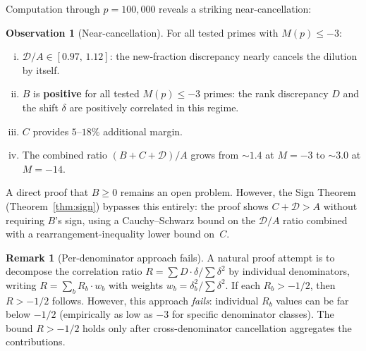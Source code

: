 \documentclass[11pt]{article}
\theoremstyle{definition}
\newtheorem{remark}[theorem]{Remark}
\newtheorem{observation}[theorem]{Observation}
\begin{document}
Computation through $p = 100{,}000$ reveals a striking near-cancellation:

\begin{observation}[Near-cancellation]\label{obs:near-cancel}
For all tested primes with $M(p) \le -3$:
\begin{enumerate}[(i)]
  \item $\mathcal{D}/A \in [0.97,\, 1.12]$: the new-fraction discrepancy nearly
    cancels the dilution by itself.
  \item $B$ is \textbf{positive} for all tested $M(p) \le -3$ primes:
    the rank discrepancy $D$ and
    the shift $\delta$ are positively correlated in this regime.
  \item $C$ provides $5$--$18\%$ additional margin.
  \item The combined ratio $(B + C + \mathcal{D})/A$ grows from ${\sim}1.4$ at
    $M = -3$ to ${\sim}3.0$ at $M = -14$.
\end{enumerate}
\end{observation}

\noindent A direct proof that $B \ge 0$ remains an open problem.
However, the Sign Theorem (Theorem~\ref{thm:sign}) bypasses
this entirely: the proof shows $C + \mathcal{D} > A$
without requiring $B$'s sign, using a Cauchy--Schwarz bound on
the $\mathcal{D}/A$ ratio
combined with a rearrangement-inequality lower bound on~$C$.

\begin{remark}[Per-denominator approach fails]
\label{rem:per-denom-fail}
A natural proof attempt is to decompose the correlation ratio
$R = \sum D \cdot \delta / \sum \delta^2$ by individual
denominators, writing $R = \sum_b R_b \cdot w_b$ with
weights $w_b = \delta_b^2 / \sum \delta^2$.  If each
$R_b > -1/2$, then $R > -1/2$ follows.  However, this
approach \emph{fails}: individual $R_b$ values can be
far below $-1/2$ (empirically as low as $-3$ for specific
denominator classes).  The bound $R > -1/2$ holds only
after cross-denominator cancellation aggregates the
contributions.
\end{remark}
\end{document}
